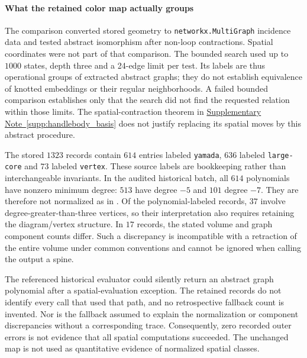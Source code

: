 \documentclass[10pt,twocolumn]{article}
\providecommand{\SuppSubsecref}[1]{\hyperref[#1]{Supplementary Note~\ref*{#1}}}
\begin{document}
\paragraph{What the retained color map actually groups}
The comparison converted stored geometry to \texttt{networkx.MultiGraph} incidence data and tested abstract isomorphism after non-loop contractions. Spatial coordinates were not part of that comparison. The bounded search used up to $1000$ states, depth three and a 24-edge limit per test. Its labels are thus operational groups of extracted abstract graphs; they do not establish equivalence of knotted embeddings or their regular neighborhoods. A failed bounded comparison establishes only that the search did not find the requested relation within those limits. The spatial-contraction theorem in \SuppSubsecref{supp:handlebody_basis} does not justify replacing its spatial moves by this abstract procedure.

The stored $1323$ records contain $614$ entries labeled \texttt{yamada}, $636$ labeled \texttt{large-core} and $73$ labeled \texttt{vertex}. These source labels are bookkeeping rather than interchangeable invariants. In the audited historical batch, all $614$ polynomials have nonzero minimum degree: $513$ have degree $-5$ and $101$ degree $-7$. They are therefore not normalized as in . Of the polynomial-labeled records, $37$ involve degree-greater-than-three vertices, so their interpretation also requires retaining the diagram/vertex structure. In $17$ records, the stated volume and graph component counts differ. Such a discrepancy is incompatible with a retraction of the entire volume under common conventions and cannot be ignored when calling the output a spine.

The referenced historical evaluator could silently return an abstract graph polynomial after a spatial-evaluation exception. The retained records do not identify every call that used that path, and no retrospective fallback count is invented. Nor is the fallback assumed to explain the normalization or component discrepancies without a corresponding trace. Consequently, zero recorded outer errors is not evidence that all spatial computations succeeded. The unchanged map is not used as quantitative evidence of normalized spatial classes.
\end{document}
